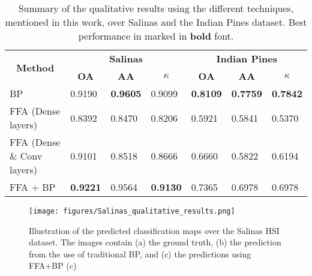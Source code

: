 \documentclass{article}
\begin{document}
\begin{table}[]
\caption{Summary of the qualitative results using the different techniques, mentioned in this work, over Salinas and the Indian Pines dataset. Best performance in marked in \textbf{bold} font.}
\label{tab:tab1}
\centering
\scriptsize 
\begin{tabular}{|l|lll|lll|}
\hline
\multicolumn{1}{|c|}{\multirow{2}{*}{\textbf{Method}}} &
  \multicolumn{3}{c|}{\textbf{Salinas}} &
  \multicolumn{3}{c|}{\textbf{Indian   Pines}} \\ \cline{2-7} 
\multicolumn{1}{|c|}{} &
  \multicolumn{1}{c|}{\textbf{OA}} &
  \multicolumn{1}{c|}{\textbf{AA}} &
  \multicolumn{1}{c|}{\textbf{$\kappa$}} &
  \multicolumn{1}{c|}{\textbf{OA}} &
  \multicolumn{1}{c|}{\textbf{AA}} &
  \multicolumn{1}{c|}{\textbf{$\kappa$}} \\ \hline
BP &
  \multicolumn{1}{l|}{0.9190} &
  \multicolumn{1}{l|}{\textbf{0.9605}} &
  0.9099 &
  \multicolumn{1}{l|}{\textbf{0.8109}} &
  \multicolumn{1}{l|}{\textbf{0.7759}} &
  \textbf{0.7842} \\ \hline
FFA (Dense   layers) &
  \multicolumn{1}{l|}{0.8392} &
  \multicolumn{1}{l|}{0.8470} &
   0.8206&
  \multicolumn{1}{l|}{0.5921} &
  \multicolumn{1}{l|}{0.5841} &
   0.5370\\ \hline
FFA (Dense \& Conv layers) &
  \multicolumn{1}{l|}{0.9101} &
  \multicolumn{1}{l|}{0.8518} &
  0.8666 &
  \multicolumn{1}{l|}{0.6660} &
  \multicolumn{1}{l|}{0.5822} &
  0.6194 \\ \hline
FFA + BP &
  \multicolumn{1}{l|}{\textbf{0.9221}} &
  \multicolumn{1}{l|}{0.9564} &
  \textbf{0.9130} &
  \multicolumn{1}{l|}{0.7365} &
  \multicolumn{1}{l|}{0.6978} &
  0.6978 \\ \hline
\end{tabular}
\end{table}



\begin{figure}[ht]%
\centering
\texttt{[image: figures/Salinas\_qualitative\_results.png]}
\caption{Illustration of the predicted classification maps over the Salinas HSI dataset. The images contain (a) the ground truth, (b) the prediction from the use of traditional BP, and (c) the predictions using FFA+BP (c)}\label{fig2}
\end{figure}
\end{document}
